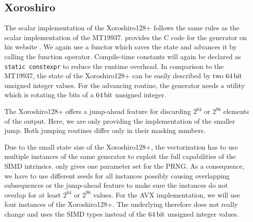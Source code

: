 \documentclass{stdlocal}
\begin{document}

  \subsection{Xoroshiro} %
  \label{sub:xoroshiro}
    The scalar implementation of the Xoroshiro128+ follows the same rules as the scalar implementation of the MT19937.
    \citeauthor{vigna-xoroshiro} provides the C code for the generator on his website \autocite{vigna-xoroshiro}.
    We again use a functor which saves the state and advances it by calling the function operator.
    Compile-time constants will again be declared as \texttt{static constexpr} to reduce the runtime overhead.
    In comparison to the MT19937, the state of the Xoroshiro128+ can be easily described by two $64\, \mathrm{bit}$ unsigned integer values.
    For the advancing routine, the generator needs a utility which is rotating the bits of a $64\, \mathrm{bit}$ unsigned integer.

    The Xoroshiro128+ offers a jump-ahead feature for discarding $2^{64}$ or $2^{96}$ elements of the output.
    Here, we are only providing the implementation of the smaller jump.
    Both jumping routines differ only in their masking numbers.


    Due to the small state size of the Xoroshiro128+, the vectorization has to use multiple instances of the same generator to exploit the full capabilities of the SIMD intrinsics.
    \citeauthor{vigna-xoroshiro} only gives one parameter set for the PRNG.
    As a consequence, we have to use different seeds for all instances possibly causing overlapping subsequences or the jump-ahead feature to make sure the instances do not overlap for at least $2^{64}$ or $2^{96}$ values.
    For the AVX implementation, we will use four instances of the Xoroshiro128+.
    The underlying therefore does not really change and uses the SIMD types instead of the $64\, \mathrm{bit}$ unsigned integer values.
\end{document}

